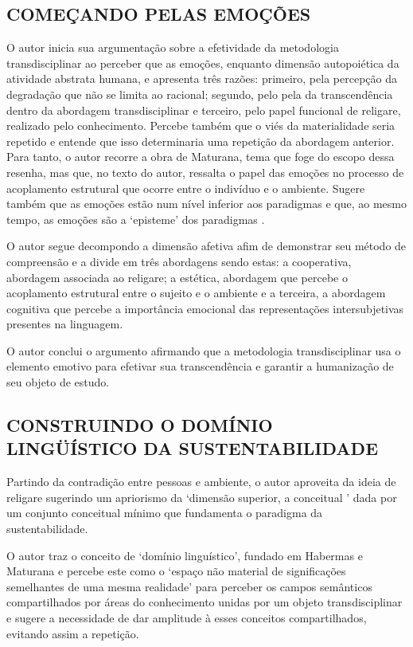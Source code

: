 \documentclass[
   article,       %
   12pt,          %
   oneside,       %
   a4paper,       %
   english,       %
   brazil,           %
   sumario=tradicional
   ]{abntex2}
\begin{document}
\subsection{COMEÇANDO PELAS EMOÇÕES}

O autor inicia sua argumentação sobre a efetividade da metodologia transdisciplinar ao perceber que as emoções, enquanto dimensão autopoiética da atividade abstrata humana, e apresenta três razões: primeiro, pela percepção da degradação que não se limita ao racional; segundo, pelo pela da transcendência dentro da abordagem transdisciplinar e terceiro, pelo papel funcional de religare, realizado pelo conhecimento. Percebe também que o viés da materialidade seria repetido e entende que isso determinaria uma repetição da abordagem anterior. Para tanto, o autor recorre a obra de Maturana, tema que foge do escopo dessa resenha, mas que, no texto do autor, ressalta o papel das emoções no processo de acoplamento estrutural que ocorre entre o indivíduo e o ambiente.
Sugere também que as emoções estão num nível inferior aos paradigmas e que, ao mesmo tempo, as emoções são a ‘episteme’ dos paradigmas \cite[p. 86]{Paradigma_Transdisciplinar_Metodologica}.

O autor segue decompondo a dimensão afetiva afim de demonstrar seu método de compreensão e a divide em três abordagens sendo estas:  a cooperativa, abordagem associada ao religare; a estética, abordagem que percebe o acoplamento estrutural entre o sujeito e o ambiente e a terceira, a abordagem cognitiva que percebe a importância emocional das representações intersubjetivas presentes na linguagem.

O autor conclui o argumento afirmando que a metodologia transdisciplinar usa o elemento emotivo para efetivar sua transcendência e garantir a humanização de seu objeto de estudo.


\subsection{CONSTRUINDO O DOMÍNIO LINGÜÍSTICO DA SUSTENTABILIDADE}

Partindo da contradição entre pessoas e ambiente, o autor aproveita da ideia de religare sugerindo um apriorismo da ‘dimensão superior, a conceitual \cite[p. 88]{Paradigma_Transdisciplinar_Metodologica}’ dada por um conjunto conceitual mínimo que fundamenta o paradigma da sustentabilidade.

O autor traz o conceito de ‘domínio linguístico’, fundado em Habermas e Maturana e percebe este como o ‘espaço não material de significações semelhantes de uma mesma realidade’ \cite[p. 86]{Paradigma_Transdisciplinar_Metodologica} para perceber os campos semânticos compartilhados por áreas do conhecimento unidas por um objeto transdisciplinar e sugere a necessidade de dar amplitude à esses conceitos compartilhados, evitando assim a repetição.
\end{document}
